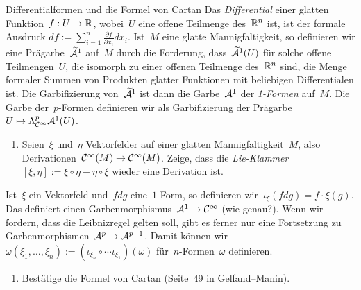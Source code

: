 \documentclass{uebblatt}
\begin{document}
\small
\begin{aufgabe}{Differentialformen und die Formel von Cartan}
Das \emph{Differential} einer glatten Funktion~$f : U \to \mathbb{R}$, wobei~$U$ eine
offene Teilmenge des~$\mathbb{R}^n$ ist, ist der formale Ausdruck
$df := \sum_{i=1}^n \frac{\partial f}{\partial x_i} dx_i$.
Ist~$M$ eine glatte Mannigfaltigkeit, so definieren wir eine
Prägarbe~$\widetilde{\mathcal{A}}^1$ auf~$M$ durch die Forderung, dass~$\widetilde{\mathcal{A}}^1(U)$
für solche offene Teilmengen~$U$, die isomorph zu einer offenen Teilmenge
des~$\mathbb{R}^n$ sind, die Menge formaler Summen von Produkten glatter Funktionen
mit beliebigen Differentialen ist. Die Garbifizierung von~$\widetilde{\mathcal{A}}^1$ ist
dann die Garbe~$\mathcal{A}^1$ der \emph{1-Formen} auf~$M$. Die Garbe der~$p$-Formen
definieren wir als Garbifizierung der Prägarbe~$U \mapsto \Lambda^p_{\mathcal{C}^\infty}
\mathcal{A}^1(U)$.

\begin{enumerate}
\item Seien~$\xi$ und~$\eta$ Vektorfelder auf einer glatten
Mannigfaltigkeit~$M$, also Derivationen~$\mathcal{C}^\infty(M) \to \mathcal{C}^\infty(M)$. Zeige,
dass die \emph{Lie-Klammer}~$[\xi,\eta] := \xi \circ \eta - \eta \circ \xi$
wieder eine Derivation ist.
\end{enumerate}
Ist~$\xi$ ein Vektorfeld und~$f dg$ eine~$1$-Form, so definieren
wir~$\iota_\xi(fdg) = f \cdot \xi(g)$. Das definiert einen Garbenmorphismus~$\mathcal{A}^1
\to \mathcal{C}^\infty$ (wie genau?). Wenn wir fordern, dass die Leibnizregel gelten
soll, gibt es ferner nur eine Fortsetzung zu Garbenmorphismen~$\mathcal{A}^p \to
\mathcal{A}^{p-1}$. Damit können wir~$\omega(\xi_1,\ldots,\xi_n) := (\iota_{\xi_n} \circ
\cdots \iota_{\xi_1})(\omega)$ für~$n$-Formen~$\omega$ definieren.
\begin{enumerate}
\addtocounter{enumi}{1}
\item Bestätige die Formel von Cartan (Seite~49 in Gelfand--Manin).
\end{enumerate}
\end{aufgabe}
\end{document}
